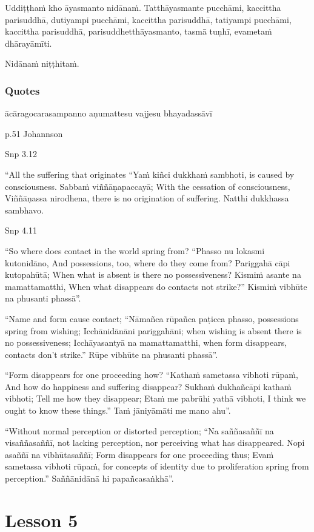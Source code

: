 \documentclass[11pt,oneside]{memoir}
\begin{document}
Uddiṭṭhaṁ kho āyasmanto nidānaṁ. Tatthāyasmante pucchāmi, kaccittha parisuddhā, dutiyampi pucchāmi, kaccittha parisuddhā, tatiyampi pucchāmi, kaccittha parisuddhā, parisuddhetthāyasmanto, tasmā tuṇhī, evametaṁ dhārayāmīti.

Nidānaṁ niṭṭhitaṁ.

\subsection{Quotes}
\label{sec:org75d4e08}

ācāragocarasampanno aṇumattesu vajjesu bhayadassāvī

p.51 Johannson

Snp 3.12

“All the suffering that originates
“Yaṁ kiñci dukkhaṁ sambhoti,
is caused by consciousness.
Sabbaṁ viññāṇapaccayā;
With the cessation of consciousness,
Viññāṇassa nirodhena,
there is no origination of suffering.
Natthi dukkhassa sambhavo.

Snp 4.11

“So where does contact in the world spring from?
“Phasso nu lokasmi kutonidāno,
And possessions, too, where do they come from?
Pariggahā cāpi kutopahūtā;
When what is absent is there no possessiveness?
Kismiṁ asante na mamattamatthi,
When what disappears do contacts not strike?”
Kismiṁ vibhūte na phusanti phassā”.

“Name and form cause contact;
“Nāmañca rūpañca paṭicca phasso,
possessions spring from wishing;
Icchānidānāni pariggahāni;
when wishing is absent there is no possessiveness;
Icchāyasantyā na mamattamatthi,
when form disappears, contacts don’t strike.”
Rūpe vibhūte na phusanti phassā”.

“Form disappears for one proceeding how?
“Kathaṁ sametassa vibhoti rūpaṁ,
And how do happiness and suffering disappear?
Sukhaṁ dukhañcāpi kathaṁ vibhoti;
Tell me how they disappear;
Etaṁ me pabrūhi yathā vibhoti,
I think we ought to know these things.”
Taṁ jāniyāmāti me mano ahu”.

“Without normal perception or distorted perception;
“Na saññasaññī na visaññasaññī,
not lacking perception, nor perceiving what has disappeared.
Nopi asaññī na vibhūtasaññī;
Form disappears for one proceeding thus;
Evaṁ sametassa vibhoti rūpaṁ,
for concepts of identity due to proliferation spring from perception.”
Saññānidānā hi papañcasaṅkhā”.

\chapter{Lesson 5}
\label{sec:org228afad}
\end{document}
